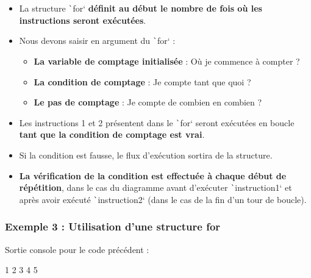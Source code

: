 \documentclass[10pt]{article}
\begin{document}
\begin{itemize}
    \item La structure \texttt`for` \textbf{définit au début le nombre de fois où les instructions seront exécutées}.
    \item Nous devons saisir en argument du \texttt`for` : 
    \begin{itemize}
        \item \textbf{La variable de comptage initialisée} : Où je commence à compter ?
        \item \textbf{La condition de comptage} : Je compte tant que quoi ?
        \item \textbf{Le pas de comptage} : Je compte de combien en combien ?
    \end{itemize}
    \item Les instructions 1 et 2 présentent dans le \texttt`for` seront exécutées en boucle \textbf{tant que la condition de comptage est vrai}.
    \item Si la condition est fausse, le flux d'exécution sortira de la structure.
    \item \textbf{La vérification de la condition est effectuée à chaque début de répétition}, dans le cas du diagramme avant d'exécuter \texttt`instruction1` et après avoir exécuté \texttt`instruction2` (dans le cas de la fin d'un tour de boucle).
\end{itemize}

\subsubsection{Exemple 3 : Utilisation d'une structure for}


\bigskip
Sortie console pour le code précédent :

\begin{textcode}
    1 2 3 4 5
\end{textcode}
\end{document}
